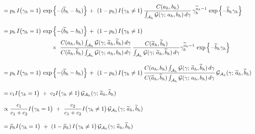 \documentclass[11pt]{article}
\newcommand{\ind}{I}
\begin{document}
\begin{enumerate}[label=Step \arabic*., leftmargin=13mm]
\begin{align*}
&= p_h\, \ind\big( \gamma_h = 1 \big)\, \exp\left\{ -(\widetilde{b}_h - b_h) \right\} \,+~ (1 - p_h)\, \ind\big( \gamma_h \ne 1 \big)\, \frac{ C(a_h,b_h) }{ \int_{\mathcal{A}_h} \mathcal{G}(\gamma;\, a_h,b_h)\, d\gamma }\, \gamma_h^{ \widetilde{a}_h - 1 }\, \exp\left\{ -\widetilde{b}_h \gamma_h \right\} \\[2ex]
&= p_h\, \ind\big( \gamma_h = 1 \big)\, \exp\left\{ -(\widetilde{b}_h - b_h) \right\} \,+~ (1 - p_h)\, \ind\big( \gamma_h \ne 1 \big) \\
& \hspace{30mm} \times~ \frac{ C(a_h,b_h) \int_{\mathcal{A}_h} \mathcal{G}(\gamma;\, \widetilde{a}_h, \widetilde{b}_h)\, d\gamma }{ C(\widetilde{a}_h, \widetilde{b}_h) \int_{\mathcal{A}_h} \mathcal{G}(\gamma;\, a_h, b_h)\, d\gamma }\, \frac{ C( \widetilde{a}_h, \widetilde{b}_h) }{ \int_{\mathcal{A}_h} \mathcal{G}(\gamma;\, \widetilde{a}_h, \widetilde{b}_h)\, d\gamma } \gamma_h^{ \widetilde{a}_h - 1 }\, \exp\left\{ -\widetilde{b}_h \gamma_h \right\} \\[2ex]
&= p_h\, \ind\big( \gamma_h = 1 \big)\, \exp\left\{ -(\widetilde{b}_h - b_h) \right\} \,+~ (1 - p_h)\, \ind\big( \gamma_h \ne 1 \big)\, \frac{ C(a_h,b_h) \int_{\mathcal{A}_h} \mathcal{G}(\gamma;\, \widetilde{a}_h, \widetilde{b}_h)\, d\gamma }{ C(\widetilde{a}_h, \widetilde{b}_h) \int_{\mathcal{A}_h} \mathcal{G}(\gamma;\, a_h, b_h)\, d\gamma }\, \mathcal{G}_{\mathcal{A}_h} (\gamma;\, \widetilde{a}_h, \widetilde{b}_h) \\[2ex]
&= c_1 \ind\big( \gamma_h = 1 \big) ~+~ c_2 \ind\big( \gamma_h \ne 1 \big)\, \mathcal{G}_{\mathcal{A}_h} (\gamma;\, \widetilde{a}_h, \widetilde{b}_h) \\[2ex]
&\propto \frac{ c_1 }{ c_1 + c_2 } \ind\big( \gamma_h = 1 \big) ~+~ \frac{ c_2 }{ c_1 + c_2 } \ind\big( \gamma_h \ne 1 \big)\, \mathcal{G}_{\mathcal{A}_h} (\gamma;\, \widetilde{a}_h, \widetilde{b}_h) \\[2ex]
&= \widetilde{p}_h \ind\big( \gamma_h = 1 \big) ~+~ (1 - \widetilde{p}_h)\, \ind\big( \gamma_h \ne 1 \big)\, \mathcal{G}_{\mathcal{A}_h} (\gamma;\, \widetilde{a}_h, \widetilde{b}_h) \\[2ex]
\end{align*}





\end{enumerate}
\end{document}
